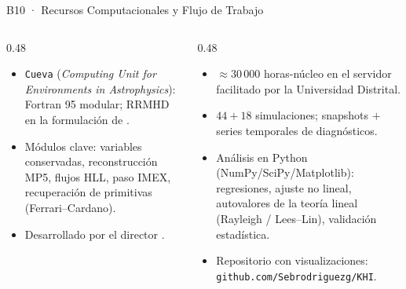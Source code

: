 \documentclass[aspectratio=169,9pt]{beamer}
\begin{document}
\begin{frame}{B10 · Recursos Computacionales y Flujo de Trabajo}
\begin{columns}[T]
\begin{column}{0.48\textwidth}
  \begin{tcolorbox}[EQ={El c\'odigo}]
    \scriptsize
    \begin{itemize}\setlength\itemsep{2pt}
      \item \texttt{Cueva} (\textit{Computing Unit for Environments in
            Astrophysics}): Fortran 95 modular; RRMHD en la formulaci\'on
            de \citet{komissarov-2007}.
      \item M\'odulos clave: variables conservadas, reconstrucci\'on MP5,
            flujos HLL, paso IMEX, recuperaci\'on de primitivas
            (Ferrari--Cardano).
      \item Desarrollado por el director
            \citep{miranda-aranguren-2014,miranda-aranguren-2018}.
    \end{itemize}
  \end{tcolorbox}
\end{column}
\begin{column}{0.48\textwidth}
  \begin{tcolorbox}[RES={La campa\~na}]
    \scriptsize
    \begin{itemize}\setlength\itemsep{2pt}
      \item $\approx30\,000$ horas-n\'ucleo en el servidor facilitado por
            la Universidad Distrital.
      \item $44+18$ simulaciones; snapshots $+$ series temporales de
            diagn\'osticos.
      \item An\'alisis en Python (NumPy/SciPy/Matplotlib):
            regresiones, ajuste no lineal, autovalores de la teor\'ia
            lineal (Rayleigh / Lees--Lin), validaci\'on estad\'istica.
      \item Repositorio con visualizaciones:
            \texttt{github.com/Sebrodriguezg/KHI}.
    \end{itemize}
  \end{tcolorbox}
\end{column}
\end{columns}
\end{frame}
\end{document}
